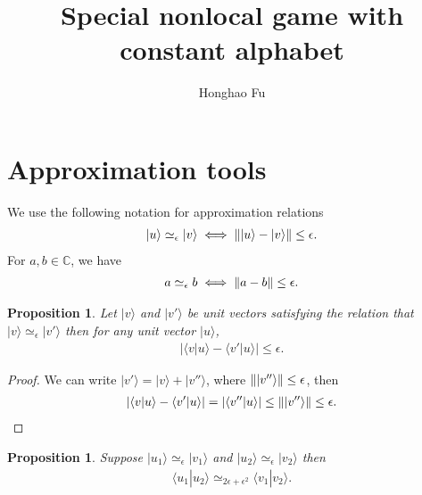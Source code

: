 \documentclass[11pt,letterpaper]{article}
\newcommand{\ket}[1]{|#1\rangle}
\newcommand{\braket}[2]{\langle#1|#2\rangle}
\DeclarePairedDelimiter{\norm}{\lVert}{\rVert}
\newcommand{\C}{\mathbb{C}}
\newcommand{\1}{\mathbb{1}}
\newcommand{\ep}{\epsilon}
\newcommand{\appd}[1]{\simeq_{#1}}
\newtheorem{proposition}[theorem]{Proposition}
\theoremstyle{definition}
\begin{document}
\title{Special nonlocal game with constant alphabet}

\author[1]{Honghao Fu}


\renewcommand\Affilfont{\itshape\small}


\maketitle

\section{Approximation tools}
We use the following notation for approximation relations
\begin{align}
	\ket{u} \appd{\epsilon} \ket{v} \iff \norm{\ket{u} - \ket{v}} \leq \epsilon. 
\end{align}
For $a,b \in \C$, we have
\begin{align}
	a \appd{\epsilon} b \iff \norm{a-b} \leq \epsilon.
\end{align}
\begin{proposition}
	Let $\ket{v}$ and $\ket{v'}$ be unit vectors satisfying the relation that $\ket{v} \appd{\epsilon} \ket{v'}$
	then for any unit vector $\ket{u}$,
	\begin{align}
		| \braket{v}{u} - \braket{v'}{u} | \leq \epsilon.
	\end{align}	
\end{proposition}
\begin{proof}
	We can write $\ket{v'} = \ket{v} + \ket{v''}$, where $\norm{\ket{v''}} \leq \epsilon$,
	then
	\begin{align}
	| \braket{v}{u} - \braket{v'}{u} | = |\braket{v''}{u}| \leq \norm{\ket{v''}} \leq \epsilon.
	\end{align}
\end{proof}
\begin{proposition}
	Suppose $\ket{u_1} \appd{\ep} \ket{v_1}$ and $\ket{u_2} \appd{\ep} \ket{v_2}$
	then 
	\begin{align}
		\braket{u_1}{u_2} \appd{2\ep+\ep^2} \braket{v_1}{v_2}.
	\end{align}
\end{proposition}
\end{document}
